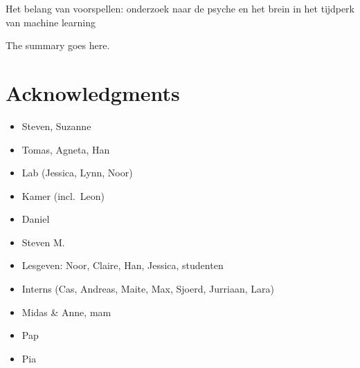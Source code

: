 \documentclass[11pt,american,a4paper,oneside,]{memoir} %
\newenvironment{dutch}[2][]{\begin{otherlanguage}{dutch}}{\end{otherlanguage}}
\providecommand{\tightlist}{%
  \setlength{\itemsep}{0pt}\setlength{\parskip}{0pt}}
\begin{document}

\begin{dutch}

\emph{Het belang van voorspellen: onderzoek naar de psyche en het brein in het tijdperk van machine learning}

\bigskip

The summary goes here.

\end{dutch}

\hypertarget{acknowledgments}{%
\chapter*{Acknowledgments}\label{acknowledgments}}


\begin{itemize}
\tightlist
\item
  Steven, Suzanne
\item
  Tomas, Agneta, Han
\item
  Lab (Jessica, Lynn, Noor)
\item
  Kamer (incl.~Leon)
\item
  Daniel
\item
  Steven M.
\item
  Lesgeven: Noor, Claire, Han, Jessica, studenten
\item
  Interns (Cas, Andreas, Maite, Max, Sjoerd, Jurriaan, Lara)
\item
  Midas \& Anne, mam
\item
  Pap
\item
  Pia
\end{itemize}

\backmatter
\end{document}

